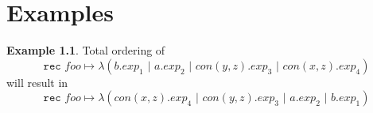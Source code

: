 \documentclass[a4paper, oneside, draft]{memoir}
\let\fref\undefined
\theoremstyle{definition}
\newtheorem{example}{Example}
\begin{document}
\chapter{Examples}









\begin{example}
  Total ordering of
  \[
  \texttt{rec } foo \mapsto \lambda (b.exp_1 \texttt{ | } a.exp_2 \texttt{ | }
  con(y, z).exp_3 \texttt{ | } con(x, z).exp_4) 
  \]
  will result in
  \[
  \texttt{rec } foo \mapsto \lambda (con(x, z).exp_4 \texttt{ | } con(y, z).exp_3  \texttt{ | } a.exp_2 \texttt{ | }
  b.exp_1)
  \]
  
\end{example}
\end{document}
